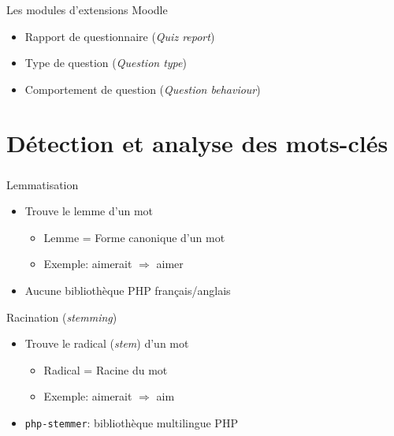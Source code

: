 \documentclass{beamer}
\begin{document}
  \begin{frame}
    \frametitle{\insertsection}
    \begin{block}{Les modules d'extensions Moodle}
      \begin{itemize}
        \item Rapport de questionnaire (\textit{Quiz report})
        \item Type de question (\textit{Question type})
        \item Comportement de question (\textit{Question behaviour})
      \end{itemize}
    \end{block}
  \end{frame}
  
  \section[Mots-cl\'es]{D\'etection et analyse des mots-cl\'es}
  \begin{frame}
    \frametitle{\insertsection}
    \begin{block}{Lemmatisation}
      \begin{itemize}
        \item Trouve le lemme d'un mot
              \begin{itemize}
                      \item Lemme = Forme \alert{canonique} d'un mot
                      \item Exemple: aimerait $\Rightarrow$ aimer
                      \end{itemize}

       \medskip
       \item Aucune biblioth\`eque PHP fran\c{c}ais/anglais
      \end{itemize}
    \end{block}
  
    \vfill
    \pause
  
    \begin{block}{Racination (\textit{stemming})}
      \begin{itemize}
        \item Trouve le radical (\textit{stem}) d'un mot
        \begin{itemize}
        \item Radical = Racine du mot
        \item Exemple: aimerait $\Rightarrow$ aim
        \end{itemize}

       \medskip
        \item \texttt{php-stemmer}: biblioth\`eque multilingue PHP
      \end{itemize}
    \end{block}
    \vfill
  \end{frame}
  
\end{document}

